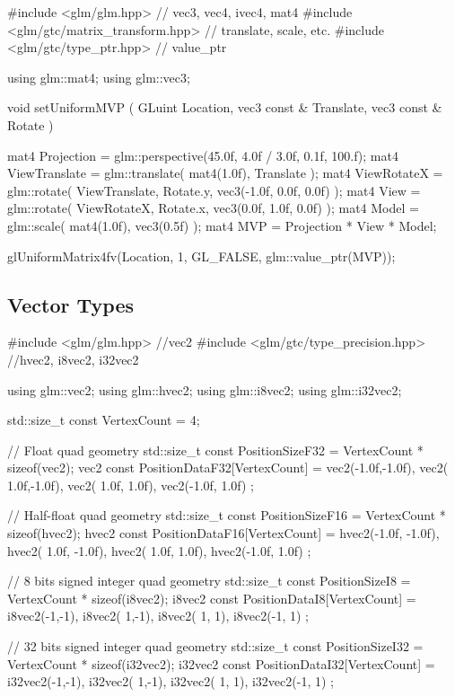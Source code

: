 \documentclass{scrartcl}
\numberwithin{figure}{subsection}
\begin{document}
\begin{cppcode}
#include <glm/glm.hpp> // vec3, vec4, ivec4, mat4
#include <glm/gtc/matrix_transform.hpp> // translate, scale, etc.
#include <glm/gtc/type_ptr.hpp> // value_ptr

using glm::mat4;
using glm::vec3;

void setUniformMVP
(
  GLuint Location, 
  vec3 const & Translate, 
  vec3 const & Rotate
)
{
  mat4 Projection = glm::perspective(45.0f, 4.0f / 3.0f, 0.1f, 100.f);
  mat4 ViewTranslate = glm::translate(
    mat4(1.0f),
    Translate
  );
  mat4 ViewRotateX = glm::rotate(
    ViewTranslate,
    Rotate.y,
    vec3(-1.0f, 0.0f, 0.0f)
  );
  mat4 View = glm::rotate(
    ViewRotateX,
    Rotate.x,
    vec3(0.0f, 1.0f, 0.0f)
  );
  mat4 Model = glm::scale(
    mat4(1.0f),
    vec3(0.5f)
  );
  mat4 MVP = Projection * View * Model;

  glUniformMatrix4fv(Location, 1, GL_FALSE, glm::value_ptr(MVP));
}
\end{cppcode}

\subsection{Vector Types}

\begin{cppcode}
#include <glm/glm.hpp> //vec2
#include <glm/gtc/type_precision.hpp> //hvec2, i8vec2, i32vec2

using glm::vec2;
using glm::hvec2;
using glm::i8vec2;
using glm::i32vec2;

std::size_t const VertexCount = 4;

// Float quad geometry
std::size_t const PositionSizeF32 = VertexCount * sizeof(vec2);
vec2 const PositionDataF32[VertexCount] =
{
  vec2(-1.0f,-1.0f),
  vec2( 1.0f,-1.0f),
  vec2( 1.0f, 1.0f),
  vec2(-1.0f, 1.0f)
};

// Half-float quad geometry
std::size_t const PositionSizeF16 = VertexCount * sizeof(hvec2);
hvec2 const PositionDataF16[VertexCount] =
{
  hvec2(-1.0f, -1.0f),
  hvec2( 1.0f, -1.0f),
  hvec2( 1.0f, 1.0f),
  hvec2(-1.0f, 1.0f)
};

// 8 bits signed integer quad geometry
std::size_t const PositionSizeI8 = VertexCount * sizeof(i8vec2);
i8vec2 const PositionDataI8[VertexCount] =
{
  i8vec2(-1,-1),
  i8vec2( 1,-1),
  i8vec2( 1, 1),
  i8vec2(-1, 1)
};

// 32 bits signed integer quad geometry
std::size_t const PositionSizeI32 = VertexCount * sizeof(i32vec2);
i32vec2 const PositionDataI32[VertexCount] =
{
  i32vec2(-1,-1),
  i32vec2( 1,-1),
  i32vec2( 1, 1),
  i32vec2(-1, 1)
};
\end{cppcode}
\end{document}
